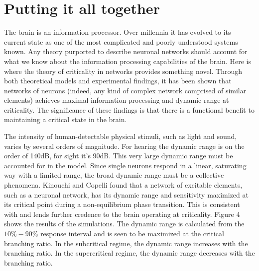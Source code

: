 \documentclass[12pt]{article}
\begin{document}
\section*{Putting it all together}

The brain is an information processor. Over millennia it has evolved to its current state as one of the most complicated and poorly understood systems known. Any theory purported to describe neuronal networks should account for what we know about the information processing capabilities of the brain. Here is where the theory of criticality in networks provides something novel. Through both theoretical models and experimental findings, it has been shown that networks of neurons (indeed, any kind of complex network comprised of similar elements) achieves maximal information processing and dynamic range at criticality. The significance of these findings is that there is a functional benefit to maintaining a critical state in the brain.

The intensity of human-detectable physical stimuli, such as light and sound, varies by several orders of magnitude. For hearing the dynamic range is on the order of 140dB, for sight it's 90dB. This very large dynamic range must be accounted for in the model. Since single neurons respond in a linear, saturating way with a limited range, the broad dynamic range must be a collective phenomena. Kinouchi and Copelli found that a network of excitable elements, such as a neuronal network, has its dynamic range and sensitivity maximized at its critical point during a non-equilibrium phase transition\cite{Kinouchi2006b}. This is consistent with and lends further credence to the brain operating at criticality. Figure 4 shows the results of the simulations. The dynamic range is calculated from the $10\%-90\%$ response interval and is seen to be maximized at the critical branching ratio. In the subcritical regime, the dynamic range increases with the branching ratio. In the supercritical regime, the dynamic range decreases with the branching ratio. \cite{Larremore2011a, Larremore2012a}
\end{document}
